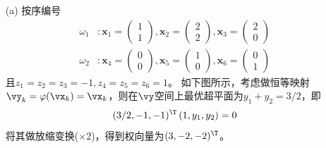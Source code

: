 \documentclass[reportComp]{thesis}
\begin{document}
\begin{answer}
\begin{itemize}
	\item [(a)] 按序编号
	\[\begin{aligned}
	\omega_{1}&: \mathbf{x}_{1}=\left(\begin{array}{c}{1} \\ {1}\end{array}\right), \mathbf{x}_{2}=\left(\begin{array}{l}{2} \\ {2}\end{array}\right), \mathbf{x}_{3}=\left(\begin{array}{l}{2} \\ {0}\end{array}\right)\\
	\omega_{2}&:\mathbf{x}_{4}=\left(\begin{array}{l}{0} \\ {0}\end{array}\right), \mathbf{x}_{5}=\left(\begin{array}{l}{1} \\ {0}\end{array}\right), \mathbf{x}_{6}=\left(\begin{array}{l}{0} \\ {1}\end{array}\right)
	\end{aligned}\]
	且$z_1=z_2=z_3=-1,z_4=z_5=z_6=1$。
	如下图所示，考虑做恒等映射$\vy_k=\varphi(\vx_k)=\vx_k$，则在$\vy$空间上最优超平面为$y_1+y_2=3/2$，即
	\[(3 / 2,-1,-1)^\T \left(1,y_{1},y_{2}\right)=0\]
	将其做放缩变换($\times 2$)，得到权向量为$(3,-2,-2)^\T $。


\end{itemize}
\end{answer}
\end{document}

